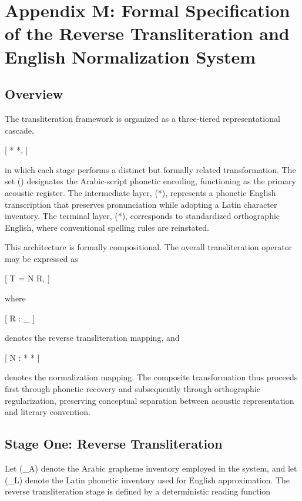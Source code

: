 \documentclass[12pt]{article}
\begin{document}
\section{Appendix M: Formal Specification of the Reverse Transliteration and English Normalization System}

\subsection{Overview}

The transliteration framework is organized as a three-tiered representational cascade,

[
 \rightarrow {}*{} \rightarrow {}*{},
]

in which each stage performs a distinct but formally related transformation. The set () designates the Arabic-script phonetic encoding, functioning as the primary acoustic register. The intermediate layer, (*{}), represents a phonetic English transcription that preserves pronunciation while adopting a Latin character inventory. The terminal layer, (*{}), corresponds to standardized orthographic English, where conventional spelling rules are reinstated.

This architecture is formally compositional. The overall transliteration operator may be expressed as

[
T = N \circ R,
]

where

[
R :  \rightarrow {}_{}
]

denotes the reverse transliteration mapping, and

[
N : *{} \rightarrow {}*{}
]

denotes the normalization mapping. The composite transformation thus proceeds first through phonetic recovery and subsequently through orthographic regularization, preserving conceptual separation between acoustic representation and literary convention.

\subsection{Stage One: Reverse Transliteration}

Let (\Sigma_A) denote the Arabic grapheme inventory employed in the system, and let (\Sigma_L) denote the Latin phonetic inventory used for English approximation. The reverse transliteration stage is defined by a deterministic reading function
\end{document}
